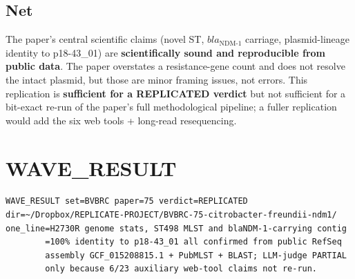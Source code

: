\documentclass[11pt]{article}
\begin{document}
\subsection*{Net}
The paper's central scientific claims (novel ST, $bla_{\text{NDM-1}}$ carriage,
plasmid-lineage identity to p18-43\_01) are \textbf{scientifically sound and reproducible from
public data}. The paper overstates a resistance-gene count and does not resolve the intact
plasmid, but those are minor framing issues, not errors. This replication is \textbf{sufficient
for a REPLICATED verdict} but not sufficient for a bit-exact re-run of the paper's full
methodological pipeline; a fuller replication would add the six web tools + long-read
resequencing.

\section*{WAVE\_RESULT}
\begin{lstlisting}
WAVE_RESULT set=BVBRC paper=75 verdict=REPLICATED
dir=~/Dropbox/REPLICATE-PROJECT/BVBRC-75-citrobacter-freundii-ndm1/
one_line=H2730R genome stats, ST498 MLST and blaNDM-1-carrying contig
        =100% identity to p18-43_01 all confirmed from public RefSeq
        assembly GCF_015208815.1 + PubMLST + BLAST; LLM-judge PARTIAL
        only because 6/23 auxiliary web-tool claims not re-run.
\end{lstlisting}
\end{document}

